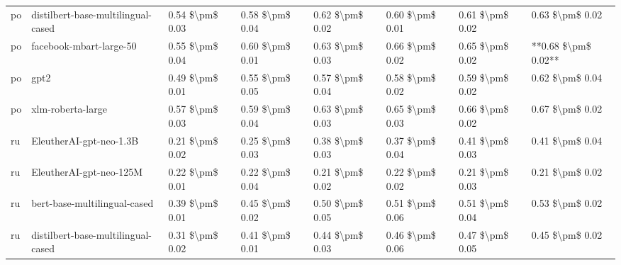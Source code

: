 \begin{tabular}{llllllll}
      po & distilbert-base-multilingual-cased & 0.54 \$\textbackslash pm\$ 0.03 &           0.58 \$\textbackslash pm\$ 0.04 &       0.62 \$\textbackslash pm\$ 0.02 &        0.60 \$\textbackslash pm\$ 0.01 &                         0.61 \$\textbackslash pm\$ 0.02 &     0.63 \$\textbackslash pm\$ 0.02 \\
      po &            facebook-mbart-large-50 & 0.55 \$\textbackslash pm\$ 0.04 &           0.60 \$\textbackslash pm\$ 0.01 &       0.63 \$\textbackslash pm\$ 0.03 &        0.66 \$\textbackslash pm\$ 0.02 &                         0.65 \$\textbackslash pm\$ 0.02 & **0.68 \$\textbackslash pm\$ 0.02** \\
      po &                               gpt2 & 0.49 \$\textbackslash pm\$ 0.01 &           0.55 \$\textbackslash pm\$ 0.05 &       0.57 \$\textbackslash pm\$ 0.04 &        0.58 \$\textbackslash pm\$ 0.02 &                         0.59 \$\textbackslash pm\$ 0.02 &     0.62 \$\textbackslash pm\$ 0.04 \\
      po &                  xlm-roberta-large & 0.57 \$\textbackslash pm\$ 0.03 &           0.59 \$\textbackslash pm\$ 0.04 &       0.63 \$\textbackslash pm\$ 0.03 &        0.65 \$\textbackslash pm\$ 0.03 &                         0.66 \$\textbackslash pm\$ 0.02 &     0.67 \$\textbackslash pm\$ 0.02 \\
      ru &            EleutherAI-gpt-neo-1.3B & 0.21 \$\textbackslash pm\$ 0.02 &           0.25 \$\textbackslash pm\$ 0.03 &       0.38 \$\textbackslash pm\$ 0.03 &        0.37 \$\textbackslash pm\$ 0.04 &                         0.41 \$\textbackslash pm\$ 0.03 &     0.41 \$\textbackslash pm\$ 0.04 \\
      ru &            EleutherAI-gpt-neo-125M & 0.22 \$\textbackslash pm\$ 0.01 &           0.22 \$\textbackslash pm\$ 0.04 &       0.21 \$\textbackslash pm\$ 0.02 &        0.22 \$\textbackslash pm\$ 0.02 &                         0.21 \$\textbackslash pm\$ 0.03 &     0.21 \$\textbackslash pm\$ 0.02 \\
      ru &       bert-base-multilingual-cased & 0.39 \$\textbackslash pm\$ 0.01 &           0.45 \$\textbackslash pm\$ 0.02 &       0.50 \$\textbackslash pm\$ 0.05 &        0.51 \$\textbackslash pm\$ 0.06 &                         0.51 \$\textbackslash pm\$ 0.04 &     0.53 \$\textbackslash pm\$ 0.02 \\
      ru & distilbert-base-multilingual-cased & 0.31 \$\textbackslash pm\$ 0.02 &           0.41 \$\textbackslash pm\$ 0.01 &       0.44 \$\textbackslash pm\$ 0.03 &        0.46 \$\textbackslash pm\$ 0.06 &                         0.47 \$\textbackslash pm\$ 0.05 &     0.45 \$\textbackslash pm\$ 0.02 \\

\end{tabular}
